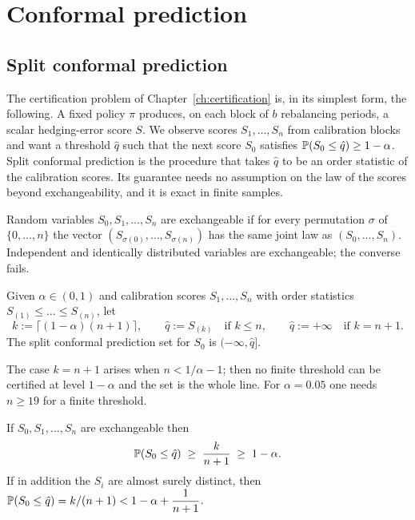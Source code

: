 \documentclass[../../../main.tex]{subfiles}
\begin{document}
\section{Conformal prediction}\label{sec:prelim-conformal}

\subsection{Split conformal prediction}

The certification problem of Chapter~\ref{ch:certification} is, in its simplest form, the following. A fixed policy $\pi$ produces, on each block of $b$ rebalancing periods, a scalar hedging-error score $S$. We observe scores $S_1,\dots,S_n$ from calibration blocks and want a threshold $\hat q$ such that the next score $S_0$ satisfies $\mathbb{P}(S_0\le\hat q)\ge1-\alpha$. Split conformal prediction \cite{vovk2005} is the procedure that takes $\hat q$ to be an order statistic of the calibration scores. Its guarantee needs no assumption on the law of the scores beyond exchangeability, and it is exact in finite samples.

\begin{definition}[Exchangeability]\label{def:prelim-exch}
Random variables $S_0,S_1,\dots,S_n$ are exchangeable if for every permutation $\sigma$ of $\{0,\dots,n\}$ the vector $(S_{\sigma(0)},\dots,S_{\sigma(n)})$ has the same joint law as $(S_0,\dots,S_n)$. Independent and identically distributed variables are exchangeable; the converse fails.
\end{definition}

\begin{definition}\label{def:prelim-split}
Given $\alpha\in(0,1)$ and calibration scores $S_1,\dots,S_n$ with order statistics $S_{(1)}\le\dots\le S_{(n)}$, let
\[
k:=\lceil(1-\alpha)(n+1)\rceil,\qquad\hat q:=S_{(k)}\quad\text{if }k\le n,\qquad\hat q:=+\infty\quad\text{if }k=n+1 .
\]
The split conformal prediction set for $S_0$ is $(-\infty,\hat q]$.
\end{definition}

The case $k=n+1$ arises when $n<1/\alpha-1$; then no finite threshold can be certified at level $1-\alpha$ and the set is the whole line. For $\alpha=0.05$ one needs $n\ge19$ for a finite threshold.

\begin{theorem}\label{thm:prelim-coverage}
If $S_0,S_1,\dots,S_n$ are exchangeable then
\begin{equation}\label{eq:prelim-coverage}
\mathbb{P}(S_0\le\hat q)\;\ge\;\frac{k}{n+1}\;\ge\;1-\alpha .
\end{equation}
If in addition the $S_i$ are almost surely distinct, then $\mathbb{P}(S_0\le\hat q)=k/(n+1)<1-\alpha+\dfrac1{n+1}$.
\end{theorem}
\end{document}

